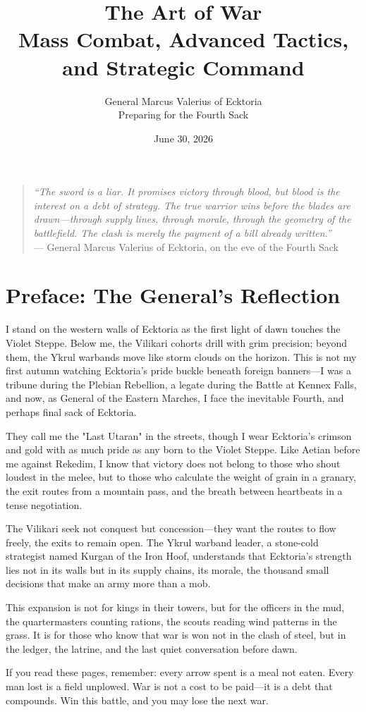 \documentclass[11pt]{article}
\title{The Art of War\\\large Mass Combat, Advanced Tactics, and Strategic Command}
\author{General Marcus Valerius of Ecktoria\\Preparing for the Fourth Sack}
\date{June 30, 2026}
\begin{document}
\begin{quote}
\textit{``The sword is a liar. It promises victory through blood, but blood is the interest on a debt of strategy. The true warrior wins before the blades are drawn—through supply lines, through morale, through the geometry of the battlefield. The clash is merely the payment of a bill already written.''}\\
— General Marcus Valerius of Ecktoria, on the eve of the Fourth Sack
\end{quote}

\section*{Preface: The General's Reflection}
I stand on the western walls of Ecktoria as the first light of dawn touches the Violet Steppe. Below me, the Vilikari cohorts drill with grim precision; beyond them, the Ykrul warbands move like storm clouds on the horizon. This is not my first autumn watching Ecktoria's pride buckle beneath foreign banners—I was a tribune during the Plebian Rebellion, a legate during the Battle at Kennex Falls, and now, as General of the Eastern Marches, I face the inevitable Fourth, and perhaps final sack of Ecktoria.

They call me the "Last Utaran" in the streets, though I wear Ecktoria's crimson and gold with as much pride as any born to the Violet Steppe. Like Aetian before me against Rekedim, I know that victory does not belong to those who shout loudest in the melee, but to those who calculate the weight of grain in a granary, the exit routes from a mountain pass, and the breath between heartbeats in a tense negotiation.

The Vilikari seek not conquest but concession—they want the routes to flow freely, the exits to remain open. The Ykrul warband leader, a stone-cold strategist named Kurgan of the Iron Hoof, understands that Ecktoria's strength lies not in its walls but in its supply chains, its morale, the thousand small decisions that make an army more than a mob. 

This expansion is not for kings in their towers, but for the officers in the mud, the quartermasters counting rations, the scouts reading wind patterns in the grass. It is for those who know that war is won not in the clash of steel, but in the ledger, the latrine, and the last quiet conversation before dawn.

If you read these pages, remember: every arrow spent is a meal not eaten. Every man lost is a field unplowed. War is not a cost to be paid—it is a debt that compounds. Win this battle, and you may lose the next war. 
\end{document}

